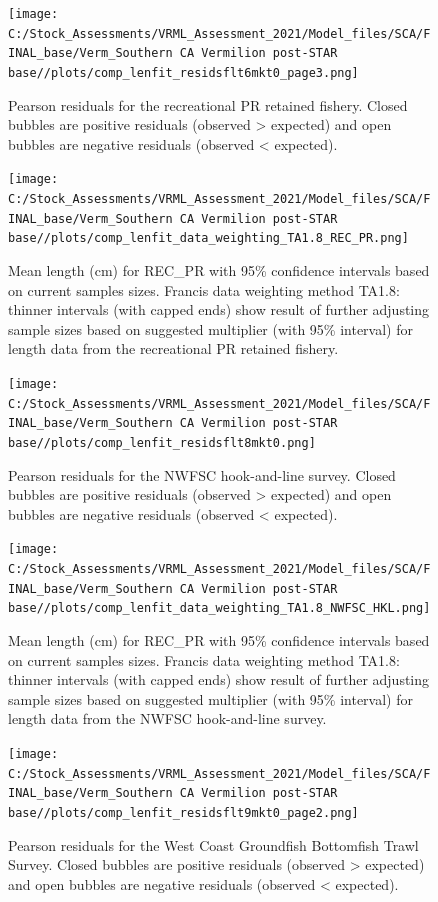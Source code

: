 \documentclass[11pt,
  english,
]{article}
\begin{document}
\begin{figure}
\centering
\texttt{[image: C:/Stock\_Assessments/VRML\_Assessment\_2021/Model\_files/SCA/FINAL\_base/Verm\_Southern CA Vermilion post-STAR base//plots/comp\_lenfit\_residsflt6mkt0\_page3.png]}
\caption{Pearson residuals for the recreational PR retained fishery. Closed bubbles are positive residuals (observed \textgreater{} expected) and open bubbles are negative residuals (observed \textless{} expected).\label{fig:len-pearson-REC-PR}}
\end{figure}

\begin{figure}
\centering
\texttt{[image: C:/Stock\_Assessments/VRML\_Assessment\_2021/Model\_files/SCA/FINAL\_base/Verm\_Southern CA Vermilion post-STAR base//plots/comp\_lenfit\_data\_weighting\_TA1.8\_REC\_PR.png]}
\caption{Mean length (cm) for REC\_PR with 95\% confidence intervals based on current samples sizes. Francis data weighting method TA1.8: thinner intervals (with capped ends) show result of further adjusting sample sizes based on suggested multiplier (with 95\% interval) for length data from the recreational PR retained fishery.\label{fig:mean-len-fit-REC-PR}}
\end{figure}

\begin{figure}
\centering
\texttt{[image: C:/Stock\_Assessments/VRML\_Assessment\_2021/Model\_files/SCA/FINAL\_base/Verm\_Southern CA Vermilion post-STAR base//plots/comp\_lenfit\_residsflt8mkt0.png]}
\caption{Pearson residuals for the NWFSC hook-and-line survey. Closed bubbles are positive residuals (observed \textgreater{} expected) and open bubbles are negative residuals (observed \textless{} expected).\label{fig:len-pearson-NWFSC-HKL}}
\end{figure}

\begin{figure}
\centering
\texttt{[image: C:/Stock\_Assessments/VRML\_Assessment\_2021/Model\_files/SCA/FINAL\_base/Verm\_Southern CA Vermilion post-STAR base//plots/comp\_lenfit\_data\_weighting\_TA1.8\_NWFSC\_HKL.png]}
\caption{Mean length (cm) for REC\_PR with 95\% confidence intervals based on current samples sizes. Francis data weighting method TA1.8: thinner intervals (with capped ends) show result of further adjusting sample sizes based on suggested multiplier (with 95\% interval) for length data from the NWFSC hook-and-line survey.\label{fig:mean-len-fit-NWFSC-HKL}}
\end{figure}

\begin{figure}
\centering
\texttt{[image: C:/Stock\_Assessments/VRML\_Assessment\_2021/Model\_files/SCA/FINAL\_base/Verm\_Southern CA Vermilion post-STAR base//plots/comp\_lenfit\_residsflt9mkt0\_page2.png]}
\caption{Pearson residuals for the West Coast Groundfish Bottomfish Trawl Survey. Closed bubbles are positive residuals (observed \textgreater{} expected) and open bubbles are negative residuals (observed \textless{} expected).\label{fig:len-pearson-NWFSC-TWL}}
\end{figure}
\end{document}
